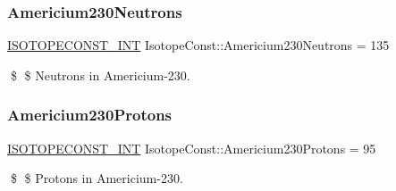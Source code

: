 \subsubsection{\texorpdfstring{Americium230\+Neutrons}{Americium230Neutrons}}
{\footnotesize\ttfamily \mbox{\hyperlink{group___isotope_const-_macros_ga5f18360b3e99483a35c32d789e62621c}{I\+S\+O\+T\+O\+P\+E\+C\+O\+N\+S\+T\+\_\+\+I\+NT}} Isotope\+Const\+::\+Americium230\+Neutrons = 135}

\$ \$ Neutrons in Americium-\/230. \mbox{\label{group___isotope_const-_americium-_am230_gaa9c6b761c29b8c9e46f5c3061316e0d5}} 
\subsubsection{\texorpdfstring{Americium230\+Protons}{Americium230Protons}}
{\footnotesize\ttfamily \mbox{\hyperlink{group___isotope_const-_macros_ga5f18360b3e99483a35c32d789e62621c}{I\+S\+O\+T\+O\+P\+E\+C\+O\+N\+S\+T\+\_\+\+I\+NT}} Isotope\+Const\+::\+Americium230\+Protons = 95}

\$ \$ Protons in Americium-\/230. 